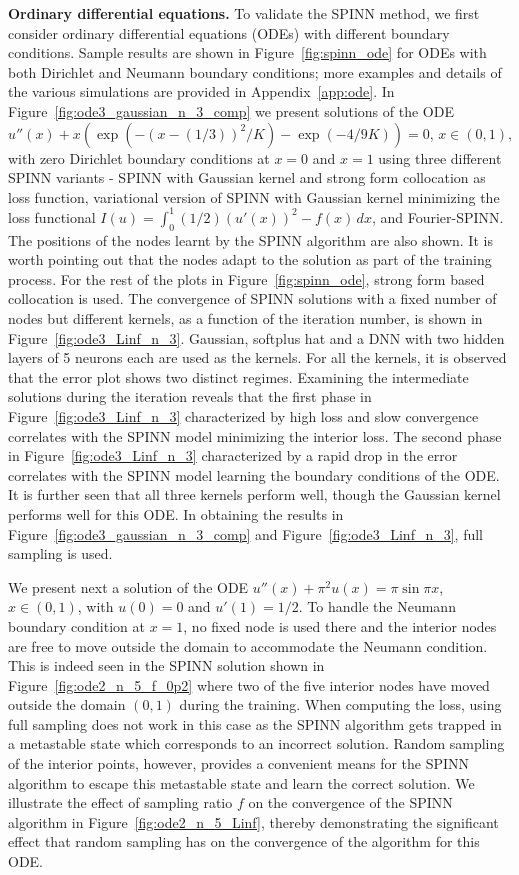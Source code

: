 \documentclass[12pt]{article}
\begin{document}
\textbf{Ordinary differential equations.} To validate the SPINN method, we first consider ordinary differential equations (ODEs) with different boundary conditions. Sample results are shown in Figure~\ref{fig:spinn_ode} for ODEs with both Dirichlet and Neumann boundary conditions; more examples and details of the various simulations are provided in Appendix~\ref{app:ode}. In Figure~\ref{fig:ode3_gaussian_n_3_comp} we present solutions of the ODE $u''(x) + x(\exp (-(x - (1/3))^2/K) - \exp (-4/9K)) = 0$, $x \in (0,1)$, with zero Dirichlet boundary conditions at $x=0$ and $x=1$ using three different SPINN variants - SPINN with Gaussian kernel and strong form collocation as loss function, variational version of SPINN with Gaussian kernel minimizing the loss functional $I(u) = \int_0^1 (1/2)(u'(x))^2 - f(x)\, dx$, and Fourier-SPINN. The positions of the nodes learnt by the SPINN algorithm are also shown. It is worth pointing out that the nodes adapt to the solution as part of the training process. For the rest of the plots in Figure~\ref{fig:spinn_ode}, strong form based collocation is used. The convergence of SPINN solutions with a fixed number of nodes but different kernels, as a function of the iteration number, is shown in Figure~\ref{fig:ode3_Linf_n_3}. Gaussian, softplus hat and a DNN with two hidden layers of 5 neurons each are used as the kernels. For all the kernels, it is observed that the error plot shows two distinct regimes. Examining the intermediate solutions during the iteration reveals that the first phase in Figure~\ref{fig:ode3_Linf_n_3} characterized by high loss and slow convergence correlates with the SPINN model minimizing the interior loss. The second phase in Figure~\ref{fig:ode3_Linf_n_3} characterized by a rapid drop in the error correlates with the SPINN model learning the boundary conditions of the ODE. It is further seen that all three kernels perform well, though the Gaussian kernel performs well for this ODE. In obtaining the results in Figure~\ref{fig:ode3_gaussian_n_3_comp} and Figure~\ref{fig:ode3_Linf_n_3}, full sampling is used. 

We present next a solution of the ODE $u''(x) + \pi^2 u(x) = \pi \sin \pi x$, $x \in (0,1)$, with $u(0) = 0$ and $u'(1) = 1/2$. To handle the Neumann boundary condition at $x=1$, no fixed node is used there and the interior nodes are free to move outside the domain to accommodate the Neumann condition. This is indeed seen in the SPINN solution shown in Figure~\ref{fig:ode2_n_5_f_0p2} where two of the five interior nodes have moved outside the domain $(0,1)$ during the training. When computing the loss, using full sampling does not work in this case as the SPINN algorithm gets trapped in a metastable state which corresponds to an incorrect solution. Random sampling of the interior points, however, provides a convenient means for the SPINN algorithm to escape this metastable state and learn the correct solution. We illustrate the effect of sampling ratio $f$ on the convergence of the SPINN algorithm in Figure~\ref{fig:ode2_n_5_Linf}, thereby demonstrating the significant effect that random sampling has on the convergence of the algorithm for this ODE.
\end{document}
